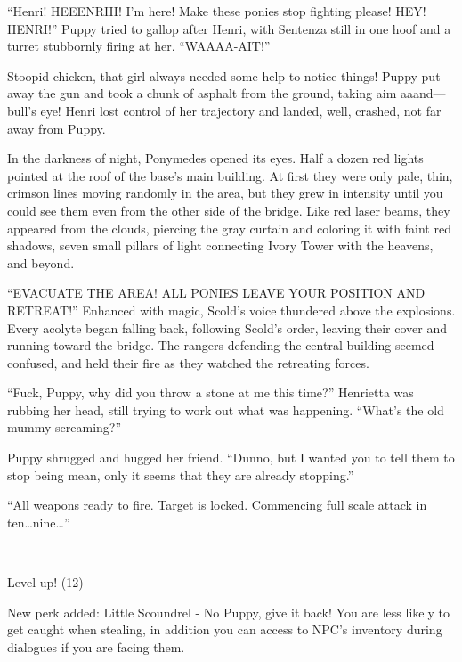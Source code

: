 
``Henri! HEEENRIII! I'm here! Make these ponies stop fighting please! HEY! HENRI!'' Puppy tried to gallop after Henri, with Sentenza still in one hoof and a turret stubbornly firing at her. ``WAAAA-AIT!''

Stoopid chicken, that girl always needed some help to notice things! Puppy put away the gun and took a chunk of asphalt from the ground, taking aim aaand---bull's eye! Henri lost control of her trajectory and landed, well, crashed, not far away from Puppy.

In the darkness of night, Ponymedes opened its eyes. Half a dozen red lights pointed at the roof of the base's main building. At first they were only pale, thin, crimson lines moving randomly in the area, but they grew in intensity until you could see them even from the other side of the bridge. Like red laser beams, they appeared from the clouds, piercing the gray curtain and coloring it with faint red shadows, seven small pillars of light connecting Ivory Tower with the heavens, and beyond.

``EVACUATE THE AREA! ALL PONIES LEAVE YOUR POSITION AND RETREAT!'' Enhanced with magic, Scold's voice thundered above the explosions. Every acolyte began falling back, following Scold's order, leaving their cover and running toward the bridge. The rangers defending the central building seemed confused, and held their fire as they watched the retreating forces.

``Fuck, Puppy, why did you throw a stone at me this time?'' Henrietta was rubbing her head, still trying to work out what was happening. ``What's the old mummy screaming?''

Puppy shrugged and hugged her friend. ``Dunno, but I wanted you to tell them to stop being mean, only it seems that they are already stopping.''

{\mten ``All weapons ready to fire. Target is locked. Commencing full scale attack in ten\dots nine\dots''}

~\vfill

\begin{engnote}
		Level up! (12)
	
		New perk added: Little Scoundrel - No Puppy, give it back! You are less likely to get caught when stealing, in addition you can access to NPC's inventory during dialogues if you are facing them.
\end{engnote}

